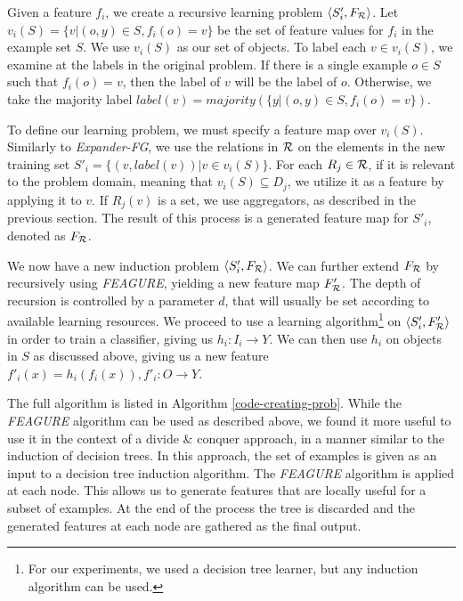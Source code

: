 \documentclass[letterpaper]{article} %
\theoremstyle{definition}
\begin{document}
Given a feature $f_{i}$, we create a recursive learning problem $\langle S'_i,F_{\cal R} \rangle$. %
Let $v_i(S) = \{v | (o,y) \in S, f_{i}(o)=v\}$ be the set of feature values for $f_i$ in the example set $S$. %
We use $v_i(S)$ as our set of objects. To label each $v \in v_i(S)$, we examine at the labels in the original problem.
If there is a single example $o \in S$ such that $f_i(o)=v$, then the label of $v$ will be the label of $o$. Otherwise, we take the majority label  $label(v)=majority(\{y|(o,y)\in S, f_i(o)=v\})$.

To define our learning problem, we must specify a feature map over $v_i(S)$. Similarly to \emph{Expander-FG}, we use the relations in ${\cal R}$ on the elements in the new training set $S'_i = \{ (v, label(v)) | v \in v_i(S) \}$.
For each $R_j\in {\cal R}$, if it is relevant to the problem domain, meaning that $v_i(S)\subseteq D_j$, we utilize it as a feature by applying it to $v$. If $R_j(v)$ is a set, we use aggregators, as described in the previous section. 
The result of this process is a generated feature map for $S'_i$, denoted as $F_{\cal R}$. 

We now have a new induction problem $\langle S'_i,F_{\cal R} \rangle$.
We can further extend $F_{\cal R}$ by recursively using \emph{FEAGURE}, yielding a new feature map $F'_{\cal R}$. The depth of recursion is controlled by a parameter $d$, that will usually be set according to available learning resources.
We proceed to use a learning algorithm\footnote{For our experiments, we used a decision tree learner, but any induction algorithm can be used.} on $\langle S'_i,F'_{\cal R} \rangle$ in order to train a classifier, giving us $h_i:I_i\rightarrow Y$. We can then use $h_i$ on objects in $S$ as discussed above, giving us a new feature $f'_{i}(x)=h_{i}(f_{i}(x)), f'_{i}:O\rightarrow Y$. 

The full algorithm is listed in Algorithm \ref{code-creating-prob}.
While the \emph{FEAGURE} algorithm can be used as described above, we found it more useful to use it in the context of a divide \& conquer approach, in a manner similar to the induction of decision trees.
In this approach, the set of examples is given as an input to a decision tree induction algorithm. The \emph{FEAGURE} algorithm is applied at each node. 
This allows us to generate features that are locally useful for a subset of examples.
At the end of the process the tree is discarded and the generated features at each node are gathered as the final output.
\end{document}
